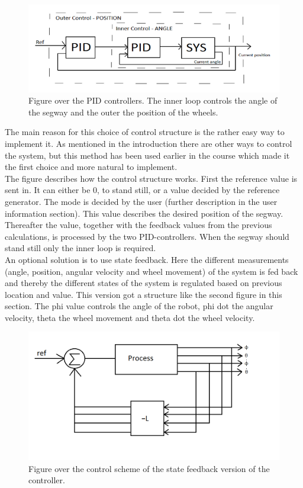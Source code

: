 \documentclass[a4paper]{article}
\begin{document}
\begin{figure}[H]
  \centering
\includegraphics[scale=0.8]{pic/PIDs.png}
\caption{Figure over the PID controllers. The inner loop controls the angle of the segway and the outer the position of the wheels.}
\end{figure}

The main reason for this choice of control structure is the rather easy way to implement it. As mentioned in the introduction there are other ways to control the system, but this method has been used earlier in the course which made it the first choice and more natural to implement. \\

The figure describes how the control structure works. First the reference value is sent in. It can either be 0, to stand still, or a value decided by the reference generator. The mode is decided by the user (further description in the user information section). This value describes the desired position of the segway. Thereafter the value, together with the feedback values from the previous calculations, is processed by the two PID-controllers. When the segway should stand still only the inner loop is required. \\

An optional solution is to use state feedback. Here the different measurements (angle, position, angular velocity and wheel movement) of the system is fed back and thereby the different states of the system is regulated based on previous location and value. This version got a structure like the second figure in this section. The phi value controls the angle of the robot, phi dot the angular velocity, theta the wheel movement and theta dot the wheel velocity. \\

\begin{figure}[H]
 \centering
\includegraphics[scale=0.5]{pic/Statefeedback.png}
\caption{Figure over the control scheme of the state feedback version of the controller.}
\end{figure}
\end{document}
